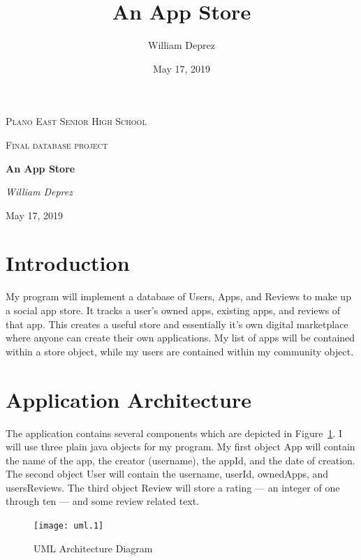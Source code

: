 \documentclass{article}
\title{An App Store}
\author{William Deprez}
\date{May 17, 2019}
\begin{document}
\begin{titlepage}
    \centering
    {\scshape\LARGE Plano East Senior High School \par}
    \vspace{1cm}
    {\scshape\Large Final database project\par}
    \vspace{1.5cm}
    {\huge\bfseries An App Store\par}
    \vspace{2cm}
    \Large\textit{William Deprez}
    \vfill
    {\large May 17, 2019\par}
\end{titlepage}

\section{Introduction}
My program will implement a database of Users, Apps, and Reviews to make up a social app store.
It tracks a user’s owned apps, existing apps, and reviews of that app.
This creates a useful store and essentially it’s own digital marketplace where anyone can create their own applications.
My list of apps will be contained within a store object, while my users are contained within my community object.

\section{Application Architecture}

The application contains several components which are depicted in Figure~\ref{UML}.
I will use three plain java objects for my program.
My first object App will contain the name of the app, the creator (username), the appId, and the date of creation.
The second object User will contain the username, userId, ownedApps, and usersReviews.
The third object Review will store a rating --- an integer of one through ten --- and some review related text.
\begin{figure}[h]
    \centering
    \texttt{[image: uml.1]}
    \caption{UML Architecture Diagram\label{UML}}
\end{figure}
\end{document}
